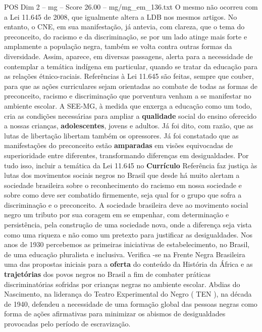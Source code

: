 \begin{textsample}{POS Dim 2 – mg – Score 26.00 – mg/mg\_em\_136.txt}  \label{ex:f2_pos_196}
O mesmo não ocorreu com a Lei 11.645 de 2008, que igualmente altera a LDB nos mesmos artigos.
No entanto, o CNE, em sua manifestação, já antevia, com clareza, que o tema do preconceito, do racismo e da discriminação, se por um lado atinge mais forte e amplamente a população negra, também se volta contra outras formas da diversidade.
Assim, aparece, em diversas passagens, alerta para a necessidade de contemplar a temática indígena em particular, quando se tratar da educação para as relações étnico-raciais.
Referências à Lei 11.645 são feitas, sempre que couber, para que as ações curriculares sejam orientadas ao combate de todas as formas de preconceito, racismo e discriminação que porventura venham a se manifestar no ambiente escolar.
A SEE-MG, à medida que enxerga a educação como um todo, cria as condições necessárias para ampliar a \textbf{qualidade} social do ensino oferecido a nossas crianças, \textbf{adolescentes}, jovens e adultos.
Já foi dito, com razão, que as lutas de libertação libertam também os opressores.
Já foi constatado que as manifestações do preconceito estão \textbf{amparadas} em visões equivocadas de superioridade entre diferentes, transformando diferenças em desigualdades.
Por tudo isso, incluir a temática da Lei 11.645 no \textbf{Currículo} Referência faz justiça às lutas dos movimentos sociais negros no Brasil que desde há muito alertam a sociedade brasileira sobre o reconhecimento do racismo em nossa sociedade e sobre como deve ser combatido firmemente, seja qual for o grupo que sofra a discriminação e o preconceito.
A sociedade brasileira deve ao movimento social negro um tributo por sua coragem em se empenhar, com determinação e persistência, pela construção de uma sociedade nova, onde a diferença seja vista como uma riqueza e não como um pretexto para justificar as desigualdades.
Nos anos de 1930 percebemos as primeiras iniciativas de estabelecimento, no Brasil, de uma educação pluralista e inclusiva.
Verifica -se na Frente Negra Brasileira uma das propostas iniciais para a \textbf{oferta} do conteúdo da História da África e as \textbf{trajetórias} dos povos negros no Brasil a fim de combater práticas discriminatórias sofridas por crianças negras no ambiente escolar.
Abdias do Nascimento, na liderança do Teatro Experimental do Negro ( TEN ), na década de 1940, defendeu a necessidade de uma formação global das pessoas negras como forma de ações afirmativas para minimizar os abismos de desigualdades provocadas pelo período de escravização.

\end{textsample}
